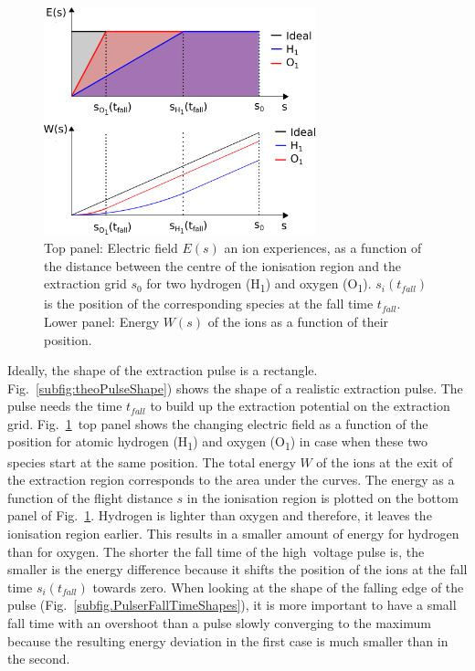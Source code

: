 	\begin{figure}[h] %
		\centering
		\includegraphics[width= 0.7\textwidth]{Bilder/PulsInt.png}
		\caption{Top panel: Electric field $E(s)$ an ion experiences, as a function of the distance between the centre of the ionisation region and the extraction grid $s_0$ for two hydrogen (H\textsubscript{1}) and oxygen (O\textsubscript{1}). $s_i(t_{fall})$ is the position of the corresponding species at the fall time $t_{fall}$. Lower panel: Energy $W(s)$ of the ions as a function of their position.}
		\label{fig:PulsInt}
	\end{figure}
	
	Ideally, the shape of the extraction pulse is a rectangle. Fig.~\ref{subfig:theoPulseShape}) shows the shape of a realistic extraction pulse. The pulse needs the time $t_{fall}$ to build up the extraction potential on the extraction grid. Fig.~\ref{fig:PulsInt}~top panel shows the changing electric field as a function of the position for atomic hydrogen (H\textsubscript{1}) and oxygen (O\textsubscript{1}) in case when these two species start at the same position. The total energy $W$ of the ions at the exit of the extraction region corresponds to the area under the curves. The energy as a function of the flight distance $s$ in the ionisation region is plotted on the bottom panel of Fig.~\ref{fig:PulsInt}. Hydrogen is lighter than oxygen and therefore, it leaves the ionisation region earlier. This results in a smaller amount of energy for hydrogen than for oxygen. The shorter the fall time of the high~voltage pulse is, the smaller is the energy difference because it shifts the position of the ions at the fall time $s_i(t_{fall})$ towards zero. When looking at the shape of the falling edge of the pulse (Fig.~\ref{subfig.PulserFallTimeShapes}), it is more important to have a small fall time with an overshoot than a pulse slowly converging to the maximum because the resulting energy deviation in the first case is much smaller than in the second.\\
	
